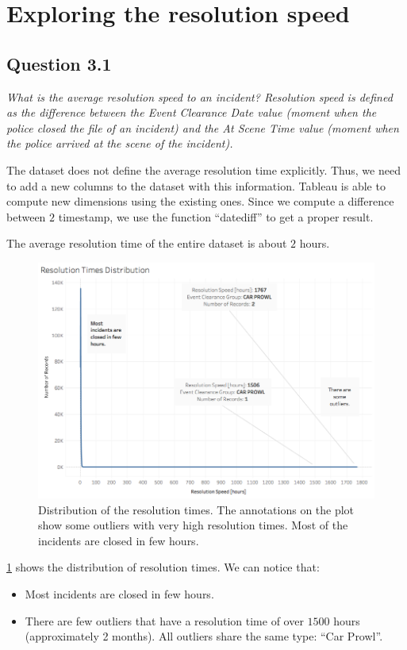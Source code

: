 \section{Exploring the resolution speed}

\subsection*{Question 3.1}
\textit{What is the average resolution speed to an incident? Resolution speed is defined as the difference between the Event Clearance Date value (moment when the police closed the file of an incident) and the At Scene Time value (moment when the police arrived at the scene of the incident).}

The dataset does not define the average resolution time explicitly.
Thus, we need to add a new columns to the dataset with this information.
Tableau is able to compute new dimensions using the existing ones.
Since we compute a difference between $2$ timestamp, we use the function ``datediff'' to get a proper result.

The average resolution time of the entire dataset is about $2$ hours.

\begin{figure}[h]
	\centering
	\includegraphics[width=0.9\columnwidth]{figures/3_1_resolution_speed_outliers}
	\caption{Distribution of the resolution times. The annotations on the plot show some outliers with very high resolution times. Most of the incidents are closed in few hours.}
	\label{fig:3_1_resolution_speed_outliers}
\end{figure}

\cref{fig:3_1_resolution_speed_outliers} shows the distribution of resolution times.
We can notice that:
\begin{itemize}
    \item Most incidents are closed in few hours.
    \item There are few outliers that have a resolution time of over $1500$ hours (approximately 2 months). All outliers share the same type: ``Car Prowl''.
\end{itemize}

